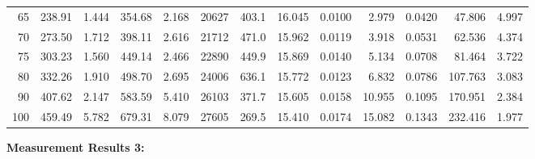 \documentclass[10pt]{article}
\begin{document}
{\begin{tabular}{|r|rr|rr|rr|rr|rr|r|r|}
       65 &       238.91 &        1.444 &       354.68 &        2.168 &        20627 &        403.1 &       16.045 &       0.0100 &        2.979 &       0.0420 &       47.806 &        4.997 \\
       70 &       273.50 &        1.712 &       398.11 &        2.616 &        21712 &        471.0 &       15.962 &       0.0119 &        3.918 &       0.0531 &       62.536 &        4.374 \\
       75 &       303.23 &        1.560 &       449.14 &        2.466 &        22890 &        449.9 &       15.869 &       0.0140 &        5.134 &       0.0708 &       81.464 &        3.722 \\
       80 &       332.26 &        1.910 &       498.70 &        2.695 &        24006 &        636.1 &       15.772 &       0.0123 &        6.832 &       0.0786 &      107.763 &        3.083 \\
       90 &       407.62 &        2.147 &       583.59 &        5.410 &        26103 &        371.7 &       15.605 &       0.0158 &       10.955 &       0.1095 &      170.951 &        2.384 \\
      100 &       459.49 &        5.782 &       679.31 &        8.079 &        27605 &        269.5 &       15.410 &       0.0174 &       15.082 &       0.1343 &      232.416 &        1.977 \\
\hline
\end{tabular}
}

\vspace{3mm}

\noindent
{\large \bf Measurement Results 3:}
\vspace{3mm}
\end{document}
